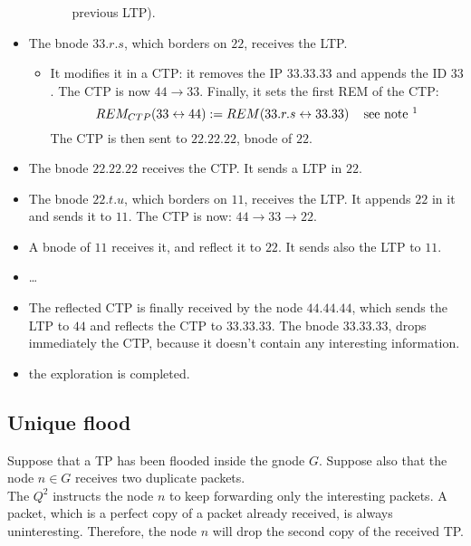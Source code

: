 \documentclass[a4paper]{article}
\begin{document}
\begin{itemize}
\begin{itemize}
\begin{itemize}
					previous LTP).
			\end{itemize}
	\end{itemize}
\item The bnode $33.r.s$, which borders on $22$, receives the LTP.
	\begin{itemize}
		\item It modifies it in a CTP: it removes the IP $33.33.33$
			and appends the ID $33$. The CTP is now $44\rightarrow
			33$. Finally, it sets the first REM of the CTP:
			\[ REM_{CTP}(33 \leftrightarrow 44):= REM(33.r.s
			\leftrightarrow 33.33)\;\;\;\textrm{ see note }
			\footnote{The node $33.r.s$
			knows that $33.33$ is a bnode of level 2 used to reach
			$44$ because it is written in the LTP. Moreover it
			knows a route to reach $33.33$, the level $2$ has been
			already explored. Thus $REM(33.r.s\leftrightarrow
			33.33)$ is a known measure.}\]
			The CTP is then sent to $22.22.22$, bnode of $22$.
	\end{itemize}
\item The bnode $22.22.22$ receives the CTP. It sends a LTP in $22$.
\item The bnode $22.t.u$, which borders on $11$, receives the LTP. It 
	appends $22$ in it and sends it to $11$. The CTP is now: $44
	\rightarrow 33\rightarrow 22$.
\item A bnode of $11$ receives it, and reflect it to $22$. It sends also the
	LTP to $11$.
\item \dots
\item The reflected CTP is finally received by the node $44.44.44$, which
	sends the LTP to $44$ and reflects the CTP to $33.33.33$. The bnode
	$33.33.33$, drops immediately the CTP, because it doesn't contain any
	interesting information.
\item the exploration is completed.
\end{itemize}


%
%

\subsection{Unique flood}
Suppose that a TP has been flooded inside the gnode $G$.
Suppose also that the node $n \in G$ receives two duplicate packets.\\
The $Q^2$ instructs the node $n$ to keep forwarding only the interesting packets.
A packet, which is a perfect copy of a packet already received, is always
uninteresting. Therefore, the node $n$ will drop the second copy of the
received TP. 
\end{document}
